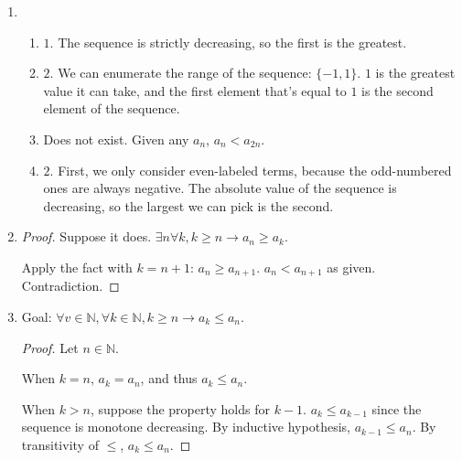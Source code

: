 \documentclass{article}
\begin{document}
\begin{enumerate}
\begin{enumerate}[label=\alph*.]
    \item true.
      \begin{proof}
        Suppose the statement is false. There exists a sequence $a_n$
        such that $\lim_{n\rightarrow \infty}a_n = c < 0$. Then for
        the positive number $-\frac{c}{2}$, there is an $N$ such that
        $n \geq N \rightarrow |a_n - c| < -\frac{c}{2}$. This
        inequality can be rewritten as $-\frac{3}{2}c < a_n <
        \frac{c}{2} < 0$, but we know $a_n \geq 0$. Contradiction.
      \end{proof}
    \item false.
      $\{n\}$ as a counterexample.
  \end{enumerate}
\item
  \begin{enumerate}[label=\alph*.]
  \item $1$. The sequence is strictly decreasing, so the first is the
    greatest.
  \item $2$. We can enumerate the range of the sequence:
    $\{-1,1\}$. $1$ is the greatest value it can take, and the first
    element that's equal to $1$ is the second element of the sequence.
  \item Does not exist. Given any $a_n$, $a_n < a_{2n}$. 
  \item $2$. First, we only consider even-labeled terms, because the
    odd-numbered ones are always negative. The absolute value of the
    sequence is decreasing, so the largest we can pick is the second.
  \end{enumerate}
\item
  \begin{proof}
    Suppose it does. $\exists n \forall k, k\geq n \rightarrow a_n
    \geq a_k$.

    Apply the fact with $k=n+1$: $a_n \geq a_{n+1}$. $a_n < a_{n+1}$
    as given. Contradiction.
  \end{proof}
\item Goal: $\forall v \in \mathbb{N}, \forall k \in \mathbb{N}, k
  \geq n \rightarrow a_k \leq a_n$.
  \begin{proof}
    Let $n \in \mathbb{N}$.

    When $k=n$, $a_k = a_n$, and thus $a_k \leq a_n$.

    When $k>n$, suppose the property holds for $k-1$.
    $a_k \leq a_{k-1}$ since the sequence is monotone decreasing. By
    inductive hypothesis, $a_{k-1} \leq a_n$. By transitivity of
    $\leq$, $a_k \leq a_n$.
  \end{proof}


\end{enumerate}
\end{document}
